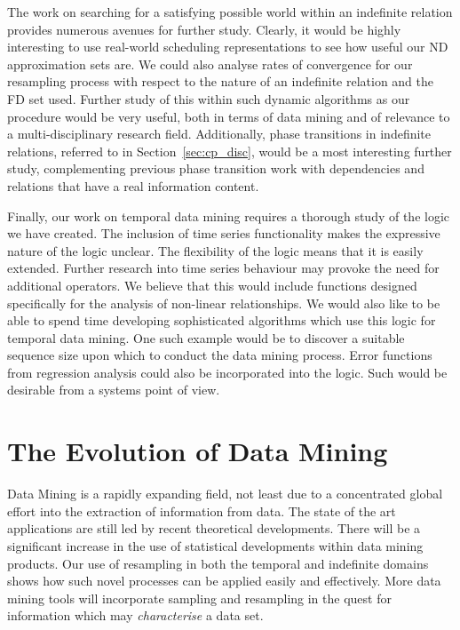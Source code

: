 \medskip
The work on searching for a satisfying possible world within an
indefinite relation provides numerous avenues for further
study. Clearly, it would be highly interesting to use real-world
scheduling representations to see how useful our ND approximation sets
are. We could also 
analyse rates of convergence for our resampling process with respect to the
nature of an indefinite relation and the FD set
used. Further study of this within
such dynamic algorithms as our procedure would be very useful, both in
terms of data mining and of relevance to a multi-disciplinary research
field. Additionally, phase transitions in indefinite
relations, referred to in Section~\ref{sec:cp_disc}, would be a most
interesting further study, complementing previous 
phase transition work with dependencies and relations that have a real
information content. 

\medskip

Finally, our work on temporal data mining requires a thorough study of
the logic we have created. The inclusion of time series functionality
makes the expressive nature of the logic unclear. The flexibility of
the logic means that it is easily extended. Further
research into time series behaviour may provoke the need for
additional operators. We believe that this would include functions
designed specifically for the analysis of non-linear relationships.
We would also like to
be able to spend time developing sophisticated algorithms which use
this logic for temporal data mining. One such example would be to
discover a suitable sequence size upon which to conduct the data
mining process. Error functions from regression analysis could also be
incorporated into the logic.  Such would be desirable from a 
systems point of view.  

\section{The Evolution of Data Mining}

Data Mining is a rapidly expanding field, not least due to a
concentrated global effort into the extraction of information from
data. The state of the art applications are still led by recent
theoretical developments. There will be a significant increase in the
use of statistical developments within data mining products. Our use
of resampling in both the temporal and indefinite domains shows how
such novel processes can be applied easily and effectively. More data
mining tools will incorporate sampling and resampling in the quest for
information which may {\em characterise} a data set.

